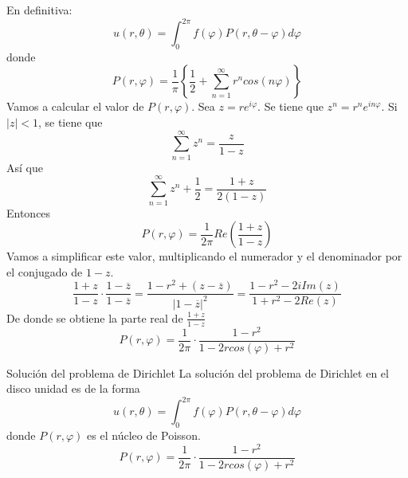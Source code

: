 En definitiva:
$$u(r,\theta) = \int_0^{2\pi}f(\varphi)P(r,\theta-\varphi)d\varphi$$
donde
$$P(r,\varphi)=\frac{1}{\pi}\left\{\frac{1}{2}+\sum_{n=1}^\infty r^n cos(n\varphi)\right\}$$
Vamos a calcular el valor de $P(r, \varphi)$. Sea $z=re^{i\varphi}$. Se tiene que $z^n=r^ne^{in\varphi}$. Si $|z|<1$, se tiene que
$$\sum_{n=1}^\infty z^n = \frac{z}{1-z}$$
Así que 
$$\sum_{n=1}^\infty z^n + \frac{1}{2} = \frac{1+z}{2(1-z)}$$
Entonces
$$P(r,\varphi) = \frac{1}{2\pi}Re\left(\frac{1+z}{1-z}\right)$$
Vamos a simplificar este valor, multiplicando el numerador y el denominador por el conjugado de $1-z$.
$$\frac{1+z}{1-z}\cdot\frac{1-\overline{z}}{1-\overline{z}} = \frac{1-r^2+(z-\overline{z})}{|1-\overline{z}|^2} = \frac{1-r^2-2iIm(z)}{1+r^2-2Re(z)}$$
De donde se obtiene la parte real de $\frac{1+z}{1-z}$
$$P(r,\varphi) = \frac{1}{2\pi}\cdot\frac{1-r^2}{1-2rcos(\varphi)+r^2}$$
\begin{mathresult}{Solución del problema de Dirichlet}
La solución del problema de Dirichlet en el disco unidad es de la forma $$u(r,\theta) = \int_0^{2\pi}f(\varphi)P(r,\theta-\varphi)d\varphi$$
donde $P(r, \varphi)$ es el núcleo de Poisson.
$$P(r,\varphi) = \frac{1}{2\pi}\cdot\frac{1-r^2}{1-2rcos(\varphi)+r^2}$$
\end{mathresult}

